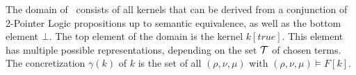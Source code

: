 The domain of \cpo\ consists of all kernels that can be derived from a conjunction of 2-Pointer Logic propositions up to semantic equivalence, as well as the bottom element $\bot$.
The top element of the domain is the kernel $k[true]$.
This element has multiple possible representations, depending on the set $\mathcal{T}$ of chosen terms.
The concretization $\gamma(k)$ of $k$ is the set of all $(\rho, \nu, \mu)$ with $(\rho, \nu, \mu) \models F[k]$.



